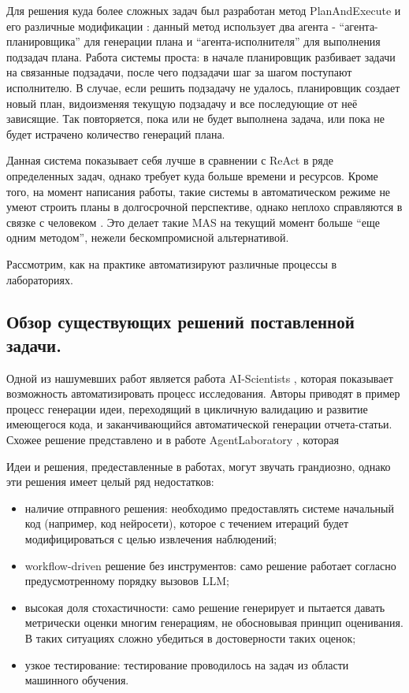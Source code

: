 Для решения куда более сложных задач был разработан метод PlanAndExecute и 
его различные модификации \cite{pae_native, pte}:
данный метод использует два агента - ``агента-планировщика'' для генерации плана и 
``агента-исполнителя'' для выполнения подзадач плана.
Работа системы проста: в начале планировщик разбивает задачи на связанные подзадачи,
после чего подзадачи шаг за шагом поступают исполнителю. В случае, если решить подзадачу
не удалось, планировщик создает новый план, видоизменяя текущую подзадачу и все 
последующие от неё зависящие. Так повторяется, пока или не будет выполнена задача,
или пока не будет истрачено количество генераций плана.

Данная система показывает себя лучше в сравнении с ReAct в ряде определенных задач,
однако требует куда больше времени и ресурсов. Кроме того, на момент написания
работы, такие системы в автоматическом режиме не умеют строить планы в 
долгосрочной перспективе, однако неплохо справляются в связке с человеком 
\cite{bad_auto_planning}. 
Это делает такие MAS на текущий момент больше ``еще одним методом'', нежели 
бескомпромисной альтернативой.

Рассмотрим, как на практике автоматизируют различные процессы в лабораториях.

\subsection{Обзор существующих решений поставленной задачи.} \label{ch2:sec2:subsec2}

Одной из нашумевших работ является работа AI-Scientists \cite{aiscientist}, 
которая показывает возможность автоматизировать процесс исследования. 
Авторы приводят в пример процесс генерации идеи, 
переходящий в цикличную валидацию и развитие имеющегося кода, и заканчивающийся 
автоматической генерации отчета-статьи.
Схожее решение представлено и в работе AgentLaboratory \cite{agentlaboratory}, которая

Идеи и решения, предеставленные в работах, могут звучать грандиозно, 
однако эти решения имеет целый ряд недостатков:
\begin{itemize}
    \item наличие отправного решения: необходимо предоставлять системе начальный код 
(например, код нейросети), которое с течением итераций будет модифицироваться 
с целью извлечения наблюдений;
    \item workflow-driven решение без инструментов: само решение работает согласно 
предусмотренному порядку вызовов LLM;
    \item высокая доля стохастичности: само решение генерирует и пытается давать 
метрически оценки многим генерациям, не обосновывая принцип оценивания. В таких ситуациях
сложно убедиться в достоверности таких оценок;
    \item узкое тестирование: тестирование проводилось на задач из области 
машинного обучения.
\end{itemize} 


